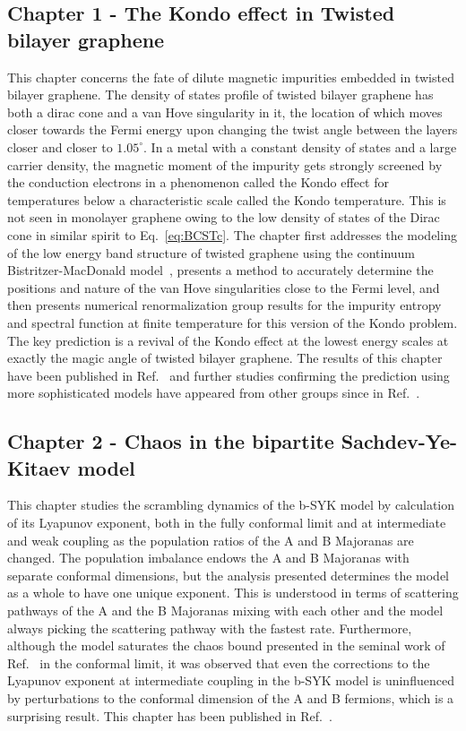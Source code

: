 \subsection{Chapter 1 - The Kondo effect in Twisted bilayer graphene}
This chapter concerns the fate of dilute magnetic impurities embedded in twisted bilayer graphene. The density of states profile of twisted bilayer graphene has both a dirac cone and a van Hove singularity in it, the location of which moves closer towards the Fermi energy upon changing the twist angle between the layers closer and closer to $1.05^\circ$. In a metal with a constant density of states and a large carrier density, the magnetic moment of the impurity gets strongly screened by the conduction electrons in a phenomenon called the Kondo effect for temperatures below a characteristic scale called the Kondo temperature. This is not seen in monolayer graphene owing to the low density of states of the Dirac cone in similar spirit to Eq.~\ref{eq:BCSTc}. The chapter first addresses the modeling of the low energy band structure of twisted graphene using the continuum Bistritzer-MacDonald model~\cite{Bistritzer2011}, presents a method to accurately determine the positions and nature of the van Hove singularities close to the Fermi level, and then presents numerical renormalization group results for the impurity entropy and spectral function at finite temperature for this version of the Kondo problem. The key prediction is a revival of the Kondo effect at the lowest energy scales at exactly the magic angle of twisted bilayer graphene. The results of this chapter have been published in Ref.~\cite{shankar2023kondo} and further studies confirming the prediction using more sophisticated models have appeared from other groups since in Ref.~\cite{chang2023vacancy}. 

\subsection{Chapter 2 - Chaos in the bipartite Sachdev-Ye-Kitaev model}
This chapter studies the scrambling dynamics of the b-SYK model by calculation of its Lyapunov exponent, both in the fully conformal limit and at intermediate and weak coupling as the population ratios of the A and B Majoranas are changed. The population imbalance endows the A and B Majoranas with separate conformal dimensions, but the analysis presented determines the model as a whole to have one unique exponent. This is understood in terms of scattering pathways of the A and the B Majoranas mixing with each other and the model always picking the scattering pathway with the fastest rate. Furthermore, although the model saturates the chaos bound presented in the seminal work of Ref.~\cite{maldacena_bound_2016} in the conformal limit, it was observed that even the corrections to the Lyapunov exponent at intermediate coupling in the b-SYK model is uninfluenced by perturbations to the conformal dimension of the A and B fermions, which is a surprising result. This chapter has been published in Ref.~\cite{shankar2023lyapunov}.


